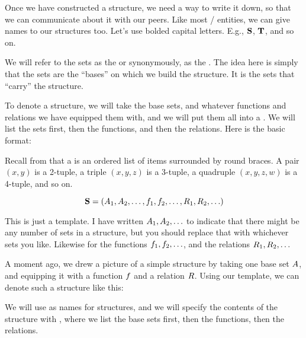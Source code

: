 \documentclass[../../../main.tex]{subfiles}
\begin{document}
Once we have constructed a structure, we need a way to write it down, so that we can communicate about it with our peers. Like most \mathical/ entities, we can give names to our structures too. Let's use bolded capital letters. E.g., $\mathbf{S}$, $\mathbf{T}$, and so on.

We will refer to the sets as the  or synonymously, as the . The idea here is simply that the sets are the ``bases'' on which we build the structure. It is the sets that ``carry'' the structure.

To denote a structure, we will take the base sets, and whatever functions and relations we have equipped them with, and we will put them all into a . We will list the sets first, then the functions, and then the relations. Here is the basic format:

\begin{aside}
  \begin{remark}
    Recall from  that a  is an ordered list of items surrounded by round braces. A pair $(x, y)$ is a 2-tuple, a triple $(x, y, z)$ is a 3-tuple, a quadruple $(x, y, z, w)$ is a 4-tuple, and so on.
  \end{remark}
\end{aside}

\begin{equation*}
    \mathbf{S} = (A_{1}, A_{2}, \ldots, f_{1}, f_{2}, \ldots, R_{1}, R_{2}, \ldots)
\end{equation*}

This is just a template. I have written $A_{1}, A_{2}, \ldots$ to indicate that there might be any number of sets in a structure, but you should replace that with whichever sets you like. Likewise for the functions $f_{1}, f_{2}, \ldots$, and the relations $R_{1}, R_{2}, \ldots$

A moment ago, we drew a picture of a simple structure by taking one base set $A$, and equipping it with a function $f$ and a relation $R$. Using our template, we can denote such a structure like this:

\begin{aside}
  \begin{notation}
    We will use  as names for structures, and we will specify the contents of the structure with , where we list the base sets first, then the functions, then the relations.
  \end{notation}
\end{aside}
\end{document}
